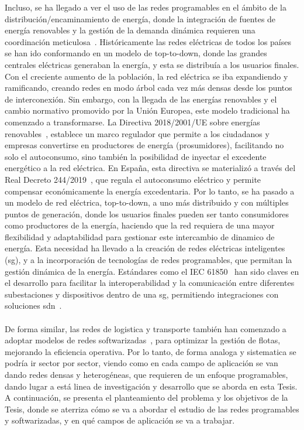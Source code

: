 Incluso, se ha llegado a ver el uso de las redes programables en el ámbito de la distribución/encaminamiento de energía, donde la integración de fuentes de energía renovables y la gestión de la demanda dinámica requieren una coordinación meticulosa~\cite{hussain2019optimal}. Históricamente las redes eléctricas de todos los países se han ido conformando en un modelo de top-to-down, donde las grandes centrales eléctricas generaban la energía, y esta se distribuía a los usuarios finales. Con el creciente aumento de la población, la red eléctrica se iba expandiendo y ramificando, creando redes en modo árbol cada vez más densas desde los puntos de interconexión. Sin embargo, con la llegada de las energías renovables y el cambio normativo promovido por la Unión Europea, este modelo tradicional ha comenzado a transformarse. La Directiva 2018/2001/UE sobre energías renovables~\cite{euREDII}, establece un marco regulador que permite a los ciudadanos y empresas convertirse en productores de energía (prosumidores), facilitando no solo el autoconsumo, sino también la posibilidad de inyectar el excedente energético a la red eléctrica. En España, esta directiva se materializó a través del Real Decreto 244/2019~\cite{rd2442019}, que regula el autoconsumo eléctrico y permite compensar económicamente la energía excedentaria. Por lo tanto, se ha pasado a un modelo de red eléctrica, top-to-down, a uno más distribuido y con múltiples puntos de generación, donde los usuarios finales pueden ser tanto consumidores como productores de la energía, haciendo que la red requiera de una mayor flexibilidad y adaptabilidad para gestionar este intercambio de dinamico de energía. Esta necesidad ha llevado a la creación de redes eléctricas inteligentes (\gls{sg}), y a la incorporación de tecnologías de redes programables, que permitan la gestión dinámica de la energía. Estándares como el IEC 61850~\cite{mackiewicz2006overview} han sido claves en el desarrollo para facilitar la interoperabilidad y la comunicación entre diferentes subestaciones y dispositivos dentro de una \gls{sg}, permitiendo integraciones con soluciones \gls{sdn}~\cite{MOLINA2015142,maziku2017software}.\\
\\
De forma similar, las redes de logistica y transporte también han comenzado a adoptar modelos de redes softwarizadas~\cite{hu2015selection}, para optimizar la gestión de flotas, mejorando la eficiencia operativa. Por lo tanto, de forma analoga y sistematica se podría ir sector por sector, viendo como en cada campo de aplicación se van dando redes densas y heterogéneas, que requieren de un enfoque programables, dando lugar a está linea de investigación y desarrollo que se aborda en esta Tesis. A continuación, se presenta el planteamiento del problema y los objetivos de la Tesis, donde se aterriza cómo se va a abordar el estudio de las redes programables y softwarizadas, y en qué campos de aplicación se va a trabajar.


